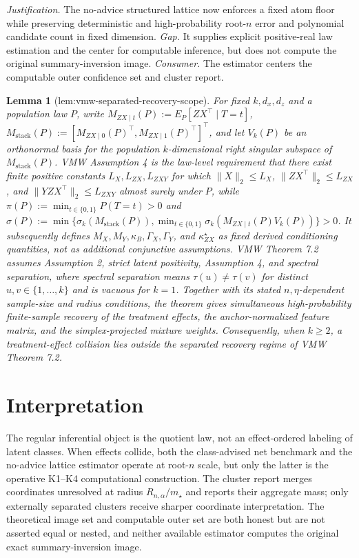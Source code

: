 \documentclass{article}
\newtheorem{lemma}{Lemma}
\begin{document}
\par\smallskip\noindent \textit{Justification.} The no-advice structured lattice now enforces a fixed atom floor while preserving deterministic and high-probability root-\(n\) error and polynomial candidate count in fixed dimension. \textit{Gap.} It supplies explicit positive-real law estimation and the center for computable inference, but does not compute the original summary-inversion image. \textit{Consumer.} The estimator centers the computable outer confidence set and cluster report.

\begin{lemma}[lem:vmw-separated-recovery-scope]\label{lem:vmw-separated-recovery-scope}
For fixed \(k,d_x,d_z\) and a population law \(P\), write \(M_{ZX\mid t}(P):=E_P[ZX^\top\mid T=t]\), \(M_{\mathrm{stack}}(P):=[M_{ZX\mid 0}(P)^\top,M_{ZX\mid 1}(P)^\top]^\top\), and let \(V_k(P)\) be an orthonormal basis for the population \(k\)-dimensional right singular subspace of \(M_{\mathrm{stack}}(P)\).  VMW Assumption 4 is the law-level requirement that there exist finite positive constants \(L_X,L_{ZX},L_{ZXY}\) for which \(\lVert X\rVert_2\le L_X\), \(\lVert ZX^\top\rVert_2\le L_{ZX}\), and \(\lVert YZX^\top\rVert_2\le L_{ZXY}\) almost surely under \(P\), while \(\pi(P):=\min_{t\in\{0,1\}}P(T=t)>0\) and \(\sigma(P):=\min\{\sigma_k(M_{\mathrm{stack}}(P)),\min_{t\in\{0,1\}}\sigma_k(M_{ZX\mid t}(P)V_k(P))\}>0\).  It subsequently defines \(M_X,M_Y,\kappa_B,\Gamma_X,\Gamma_Y\), and \(\kappa_{ZX}^{\star}\) as fixed derived conditioning quantities, not as additional conjunctive assumptions.  VMW Theorem 7.2 assumes Assumption 2, strict latent positivity, Assumption 4, and spectral separation, where spectral separation means \(\tau(u)\ne\tau(v)\) for distinct \(u,v\in\{1,\ldots,k\}\) and is vacuous for \(k=1\).  Together with its stated \(n,\eta\)-dependent sample-size and radius conditions, the theorem gives simultaneous high-probability finite-sample recovery of the treatment effects, the anchor-normalized feature matrix, and the simplex-projected mixture weights.  Consequently, when \(k\ge2\), a treatment-effect collision lies outside the separated recovery regime of VMW Theorem 7.2.
\end{lemma}

\section{Interpretation}

The regular inferential object is the quotient law, not an effect-ordered labeling of latent classes. When effects collide, both the class-advised net benchmark and the no-advice lattice estimator operate at root-\(n\) scale, but only the latter is the operative K1--K4 computational construction. The cluster report merges coordinates unresolved at radius \(R_{n,\alpha}/m_\star\) and reports their aggregate mass; only externally separated clusters receive sharper coordinate interpretation. The theoretical image set and computable outer set are both honest but are not asserted equal or nested, and neither available estimator computes the original exact summary-inversion image.
\end{document}

